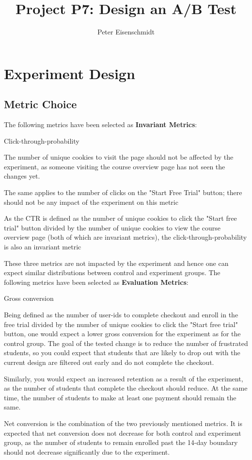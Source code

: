\documentclass[11pt]{article} %
\title{Project P7: Design an A/B Test}
\author{Peter Eisenschmidt}
\begin{document}
\maketitle

\section{Experiment Design}

\subsection{Metric Choice}

The following metrics have been selected as \textbf{Invariant Metrics}:
\begin{labeling}{Click-through-probability}
\item [Number of cookies] The number of unique cookies to visit the page should not be affected by the experiment, as someone visiting the course overview page has not seen the changes yet. 
\item [Number of clicks] The same applies to the number of clicks on the "Start Free Trial" button; there should not be any impact of the experiment on this metric
\item [Click-through-probability] As the CTR is defined as the number of unique cookies to click the "Start free trial" button divided by the number of unique cookies to view the course overview page (both of which are invariant metrics), the click-through-probability is also an invariant metric
\end{labeling}
\noindent These three metrics are not impacted by the experiment and hence one can expect similar distributions between control and experiment groups.
\medskip
\noindent The following metrics have been selected as \textbf{Evaluation Metrics}:
\begin{labeling}{Gross conversion}
\item [Gross conversion] Being defined as the number of user-ids to complete checkout and enroll in the free trial divided by the number of unique cookies to click the "Start free trial" button, one would expect a lower gross conversion for the experiment as for the control group. The goal of the tested change is to reduce the number of frustrated students, so you could expect that students that are likely to drop out with the current design are filtered out early and do not complete the checkout.
\item [Retention] Similarly, you would expect an increased retention as a result of the experiment, as the number of students that complete the checkout should reduce. At the same time, the number of students to make at least one payment should remain the same.
\item [Net conversion] Net conversion is the combination of the two previously mentioned metrics. It is expected that net conversion does not decrease for both control and experiment group, as the number of students to remain enrolled past the 14-day boundary should not decrease significantly due to the experiment.
\end{labeling}
\end{document}
